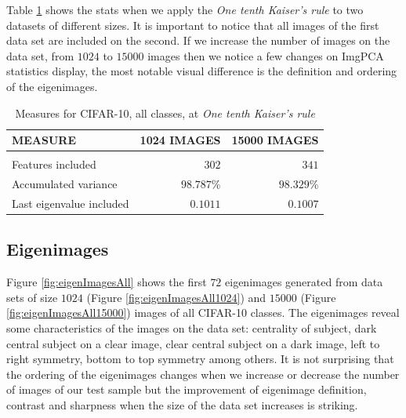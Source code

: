 \documentclass{article} %
\begin{document}
Table \ref{tab:ImgPCAcomputations} shows the stats when we apply the \emph{One tenth Kaiser's rule} to two datasets of different sizes. It is important to notice that all images of the first data set are included on the second. If we increase the number of images on the data set, from $1024$ to $15000$ images then we notice a few changes on ImgPCA statistics display, the most notable visual difference is the definition and ordering of the eigenimages.

\begin{table}[h]
\caption{Measures for CIFAR-10, all classes, at \emph{One tenth Kaiser's rule}}
\label{tab:ImgPCAcomputations}
\begin{center}
\begin{tabular}{lrr}
\multicolumn{1}{l}{\bf MEASURE}  &\multicolumn{1}{r}{\bf 1024 IMAGES}&\multicolumn{1}{r}{\bf 15000 IMAGES}
\\ \hline \\
Features included       &$302$ & $341$\\
Accumulated variance             &$98.787$\% & $98.329$\%\\
Last eigenvalue included&$0.1011$&$0.1007$\\
\end{tabular}
\end{center}
\end{table}

\subsection{Eigenimages}
Figure \ref{fig:eigenImagesAll} shows the first $72$ eigenimages generated from data sets of size $1024$ (Figure \ref{fig:eigenImagesAll1024}) and $15000$ (Figure \ref{fig:eigenImagesAll15000}) images of all CIFAR-10 classes. The eigenimages reveal some characteristics of the images on the data set: centrality of subject, dark central subject on a clear image, clear central subject on a dark image, left to right symmetry, bottom to top symmetry among others. It is not surprising that the ordering of the eigenimages changes when we increase or decrease the number of images of our test sample but the improvement of eigenimage definition, contrast and sharpness when the size of the data set increases is striking.
\end{document}
